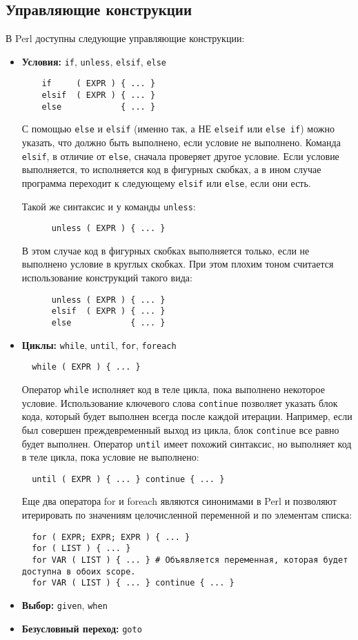 \subsection{Управляющие конструкции}
В Perl доступны следующие управляющие конструкции:
\begin{itemize}
  \item \textbf{Условия:} \verb|if|, \verb|unless|, \verb|elsif|, \verb|else|
  \begin{verbatim}
    if     ( EXPR ) { ... }
    elsif  ( EXPR ) { ... }
    else            { ... }
  \end{verbatim}
  С помощью \verb|else| и \verb|elsif| (именно так, а НЕ \verb|elseif| или \verb|else if|) можно указать, что должно быть выполнено, если условие не выполнено. Команда \verb|elsif|, в отличие от \verb|else|, сначала проверяет другое условие. Если условие выполняется, то исполняется код в фигурных скобках, а в ином случае программа переходит к следующему \verb|elsif| или  \verb|else|, если они есть.

  Такой же синтаксис и у команды \verb|unless|:
  \begin{verbatim}
      unless ( EXPR ) { ... }
  \end{verbatim}
  В этом случае код в фигурных скобках выполняется только, если не выполнено условие в круглых скобках. При этом плохим тоном считается использование конструкций такого вида:
  \begin{verbatim}
      unless ( EXPR ) { ... }
      elsif  ( EXPR ) { ... }
      else            { ... }
  \end{verbatim}

  \item \textbf{Циклы:} \verb|while|, \verb|until|, \verb|for|, \verb|foreach|
  \begin{verbatim}
  while ( EXPR ) { ... }
  \end{verbatim}
  Оператор \verb|while| исполняет код в теле цикла, пока выполнено некоторое условие. Использование ключевого слова \verb|continue| позволяет указать блок кода, который будет выполнен всегда после каждой итерации. Например, если был совершен преждевременный выход из цикла, блок \verb|continue| все равно будет выполнен. Оператор \verb|until| имеет похожий синтаксис, но выполняет код в теле цикла, пока условие не выполнено:
  \begin{verbatim}
  until ( EXPR ) { ... } continue { ... }
  \end{verbatim}
  Еще два оператора for и foreach являются синонимами в Perl и позволяют итерировать по значениям целочисленной переменной и по элементам списка:
  \begin{verbatim}
  for ( EXPR; EXPR; EXPR ) { ... }
  for ( LIST ) { ... }
  for VAR ( LIST ) { ... } # Объявляется переменная, которая будет доступна в обоих scope.
  for VAR ( LIST ) { ... } continue { ... }
  \end{verbatim}
  \item \textbf{Выбор:} \verb|given|, \verb|when|
  \item \textbf{Безусловный переход:}  \verb|goto|
\end{itemize}

